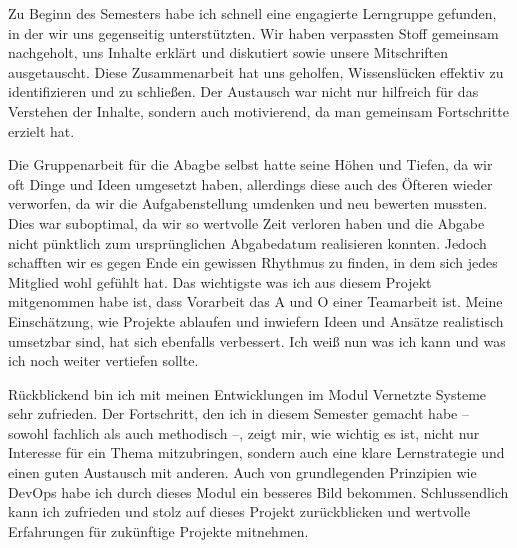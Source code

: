 Zu Beginn des Semesters habe ich schnell eine engagierte Lerngruppe gefunden, in der wir uns gegenseitig unterstützten. Wir haben verpassten Stoff gemeinsam nachgeholt, uns Inhalte erklärt und diskutiert sowie unsere Mitschriften ausgetauscht. Diese Zusammenarbeit hat uns geholfen, Wissenslücken effektiv zu identifizieren und zu schließen. Der Austausch war nicht nur hilfreich für das Verstehen der Inhalte, sondern auch motivierend, da man gemeinsam Fortschritte erzielt hat. 

Die Gruppenarbeit für die Abagbe selbst hatte seine Höhen und Tiefen, da wir oft Dinge und Ideen umgesetzt haben, allerdings diese auch des Öfteren wieder verworfen, da wir die Aufgabenstellung umdenken und neu bewerten mussten. Dies war suboptimal, da wir so wertvolle Zeit verloren haben und die Abgabe nicht pünktlich zum ursprünglichen Abgabedatum realisieren konnten. Jedoch schafften wir es gegen Ende ein gewissen Rhythmus zu finden, in dem sich jedes Mitglied wohl gefühlt hat. Das wichtigste was ich aus diesem Projekt mitgenommen habe ist, dass Vorarbeit das A und O einer Teamarbeit ist. Meine Einschätzung, wie Projekte ablaufen und inwiefern Ideen und Ansätze realistisch umsetzbar sind, hat sich ebenfalls verbessert. Ich weiß nun was ich kann und was ich noch weiter vertiefen sollte.

Rückblickend bin ich mit meinen Entwicklungen im Modul Vernetzte Systeme sehr zufrieden. Der Fortschritt, den ich in diesem Semester gemacht habe – sowohl fachlich als auch methodisch –, zeigt mir, wie wichtig es ist, nicht nur Interesse für ein Thema mitzubringen, sondern auch eine klare Lernstrategie und einen guten Austausch mit anderen. Auch von grundlegenden Prinzipien wie DevOps habe ich durch dieses Modul ein besseres Bild bekommen.  Schlussendlich kann ich zufrieden und stolz auf dieses Projekt zurückblicken und wertvolle Erfahrungen für zukünftige Projekte mitnehmen. 
